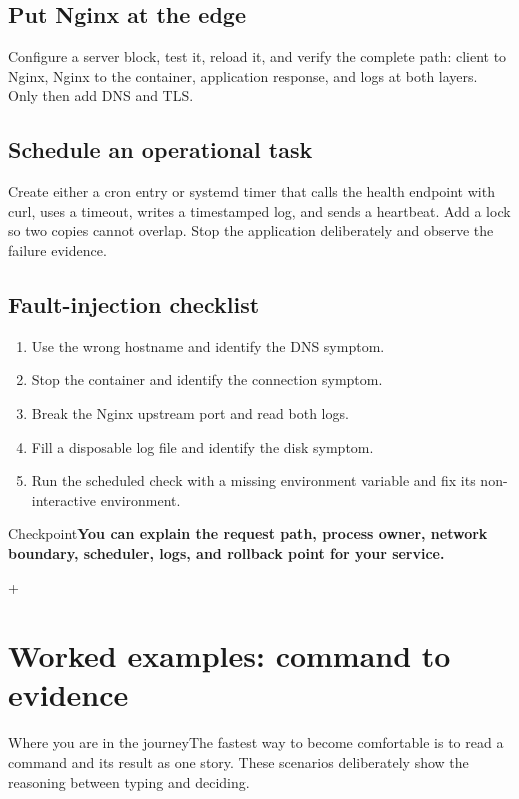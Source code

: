 \documentclass[11pt,a4paper,openany]{book}
\newcommand{\lesson}[1]{\begin{mentalbox}{Where you are in the journey}#1\end{mentalbox}}
\newcommand{\checkpoint}[1]{\begin{mentalbox}{Checkpoint}\textbf{#1}\end{mentalbox}}
\begin{document}
\section{Put Nginx at the edge}
Configure a server block, test it, reload it, and verify the complete path: client to Nginx, Nginx to the container, application response, and logs at both layers. Only then add DNS and TLS.
\section{Schedule an operational task}
Create either a cron entry or systemd timer that calls the health endpoint with curl, uses a timeout, writes a timestamped log, and sends a heartbeat. Add a lock so two copies cannot overlap. Stop the application deliberately and observe the failure evidence.
\section{Fault-injection checklist}
\begin{enumerate}
\item Use the wrong hostname and identify the DNS symptom.
\item Stop the container and identify the connection symptom.
\item Break the Nginx upstream port and read both logs.
\item Fill a disposable log file and identify the disk symptom.
\item Run the scheduled check with a missing environment variable and fix its non-interactive environment.
\end{enumerate}
\checkpoint{You can explain the request path, process owner, network boundary, scheduler, logs, and rollback point for your service.}

+
\chapter{Worked examples: command to evidence}
\lesson{The fastest way to become comfortable is to read a command and its result as one story. These scenarios deliberately show the reasoning between typing and deciding.}
\end{document}

